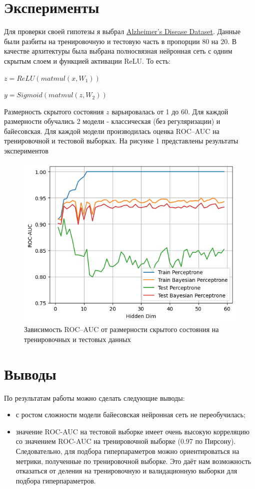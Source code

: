 \documentclass{article}
\begin{document}
\section{Эксперименты}

Для проверки своей гипотезы я выбрал \href{https://www.kaggle.com/datasets/rabieelkharoua/alzheimers-disease-dataset}{Alzheimer's Disease Dataset}. Данные были разбиты на тренировочную и тестовую часть в пропорции 80 на 20. В качестве архитектуры была выбрана полносвязная нейронная сеть с одним скрытым слоем и функцией активации ReLU. То есть:

$z = ReLU(matmul(x, W_1))$

$y = Sigmoid(matmul(z, W_2))$

Размерность скрытого состояния $z$ варьировалась от 1 до 60. Для каждой размерности обучались 2 модели - классическая (без регуляризации) и байесовская. Для каждой модели производилась оценка ROC--AUC на тренировочной и тестовой выборках. На рисунке 1 представлены результаты экспериментов

\begin{figure}
    \centering
    \includegraphics[width=1\linewidth]{roc_auc.png}
    \caption{Зависимость ROC--AUC от размерности скрытого состояния на тренировочных и тестовых данных}
    \label{fig:enter-label}
\end{figure}

\section{Выводы}
По результатам работы можно сделать следующие выводы:
\begin{itemize}
    \item с ростом сложности модели байесовская нейронная сеть не переобучилась;
    \item значение ROC-AUC на тестовой выборке имеет очень высокую корреляцию со значением ROC-AUC на тренировочной выборке (0.97 по Пирсону). Следовательно, для подбора гиперпараметров можно ориентироваться на метрики, полученные по тренировочной выборке. Это даёт нам возможность отказаться от деления на тренировочную и валидационную выборки для подбора гиперпараметров.
\end{itemize}
\end{document}
